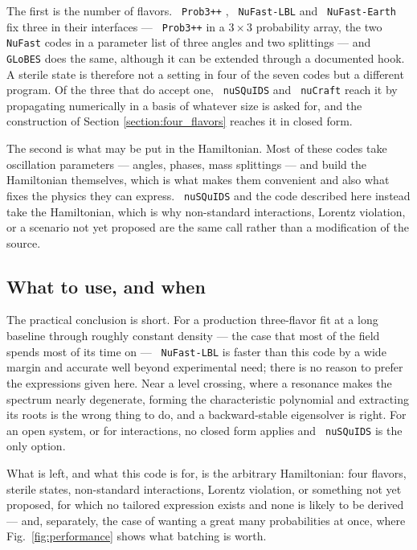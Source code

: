 \documentclass[final,5p,times,twocolumn]{elsarticle}
\newcommand{\fig}{Fig.}
\newcommand{\figu}[1]{\fig~\ref{fig:#1}}
\providecommand{\DIFaddtex}[1]{{\protect\color{blue} \sf #1}} %
\providecommand{\DIFadd}[1]{\DIFaddtex{#1}} %
\begin{document}
\DIFadd{The first is the number of flavors.  }{\tt \DIFadd{Prob3++}}\DIFadd{, }{\tt \DIFadd{NuFast-LBL}} \DIFadd{and }{\tt \DIFadd{NuFast-Earth}} \DIFadd{fix three in their interfaces --- }{\tt \DIFadd{Prob3++}} \DIFadd{in a $3 \times 3$ probability array, the two }{\tt \DIFadd{NuFast}} \DIFadd{codes in a parameter list of three angles and two splittings --- and }{\tt \DIFadd{GLoBES}} \DIFadd{does the same, although it can be extended through a documented hook.  A sterile state is therefore not a setting in four of the seven codes but a different program.  Of the three that do accept one, }{\tt \DIFadd{nuSQuIDS}} \DIFadd{and }{\tt \DIFadd{nuCraft}} \DIFadd{reach it by propagating numerically in a basis of whatever size is asked for, and the construction of Section \ref{section:four_flavors} reaches it in closed form.
}

\DIFadd{The second is what may be put in the Hamiltonian.  Most of these codes take oscillation parameters --- angles, phases, mass splittings --- and build the Hamiltonian themselves, which is what makes them convenient and also what fixes the physics they can express.  }{\tt \DIFadd{nuSQuIDS}} \DIFadd{and the code described here instead take the Hamiltonian, which is why non-standard interactions, Lorentz violation, or a scenario not yet proposed are the same call rather than a modification of the source.
}

\subsection{\DIFadd{What to use, and when}}
\label{section:what_to_use}

\DIFadd{The practical conclusion is short.  For a production three-flavor fit at a long baseline through roughly constant density --- the case that most of the field spends most of its time on --- }{\tt \DIFadd{NuFast-LBL}} \DIFadd{is faster than this code by a wide margin and accurate well beyond experimental need; there is no reason to prefer the expressions given here.  Near a level crossing, where a resonance makes the spectrum nearly degenerate, forming the characteristic polynomial and extracting its roots is the wrong thing to do, and a backward-stable eigensolver is right.  For an open system, or for interactions, no closed form applies and }{\tt \DIFadd{nuSQuIDS}} \DIFadd{is the only option.
}

\DIFadd{What is left, and what this code is for, is the arbitrary Hamiltonian: four flavors, sterile states, non-standard interactions, Lorentz violation, or something not yet proposed, for which no tailored expression exists and none is likely to be derived --- and, separately, the case of wanting a great many probabilities at once, where \figu{performance} shows what batching is worth.
}
\end{document}
